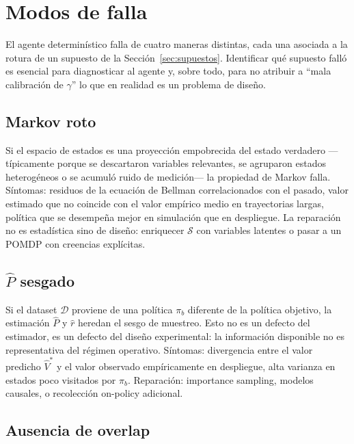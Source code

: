 \documentclass[12pt, a4paper]{article}
\theoremstyle{plain}
\theoremstyle{definition}
\newcommand{\cS}{\mathcal{S}}
\newcommand{\pibeh}{\pi_b}
\newcommand{\Phat}{\widehat{P}}
\newcommand{\rhat}{\widehat{r}}
\begin{document}
\section{Modos de falla}
\label{sec:fallos}

El agente determinístico falla de cuatro maneras distintas, cada una
asociada a la rotura de un supuesto de la Sección~\ref{sec:supuestos}.
Identificar qué supuesto falló es esencial para diagnosticar al agente y,
sobre todo, para no atribuir a ``mala calibración de $\gamma$'' lo que en
realidad es un problema de diseño.

\subsection{Markov roto}

Si el espacio de estados es una proyección empobrecida del estado
verdadero ---típicamente porque se descartaron variables relevantes, se
agruparon estados heterogéneos o se acumuló ruido de medición--- la
propiedad de Markov falla. Síntomas: residuos de la ecuación de Bellman
correlacionados con el pasado, valor estimado que no coincide con el
valor empírico medio en trayectorias largas, política que se desempeña
mejor en simulación que en despliegue. La reparación no es estadística
sino de diseño: enriquecer $\cS$ con variables latentes o pasar a un
POMDP con creencias explícitas.

\subsection{$\Phat$ sesgado}

Si el dataset $\mathcal{D}$ proviene de una política $\pibeh$
diferente de la política objetivo, la estimación $\Phat$ y $\rhat$
heredan el sesgo de muestreo. Esto no es un defecto del estimador, es
un defecto del diseño experimental: la información disponible no es
representativa del régimen operativo. Síntomas: divergencia entre el
valor predicho $\widehat{V}^{*}$ y el valor observado empíricamente en
despliegue, alta varianza en estados poco visitados por $\pibeh$.
Reparación: importance sampling, modelos causales, o recolección
on-policy adicional.

\subsection{Ausencia de overlap}
\end{document}
